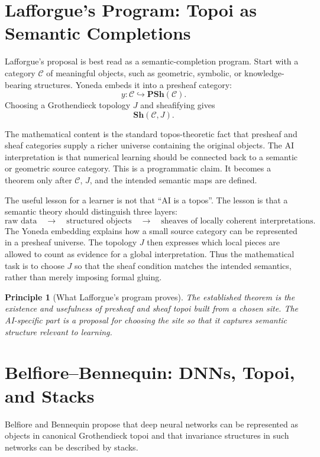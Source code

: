 \documentclass[11pt]{article}
\newtheorem{principle}[definition]{Principle}
\newcommand{\PSh}{\mathbf{PSh}}
\newcommand{\Sh}{\mathbf{Sh}}
\begin{document}
\section{Lafforgue's Program: Topoi as Semantic Completions}

Lafforgue's proposal is best read as a semantic-completion program. Start with a
category \(\mathcal C\) of meaningful objects, such as geometric, symbolic, or
knowledge-bearing structures. Yoneda embeds it into a presheaf category:
\[
y:\mathcal C\hookrightarrow \PSh(\mathcal C).
\]
Choosing a Grothendieck topology \(J\) and sheafifying gives
\[
\Sh(\mathcal C,J).
\]

The mathematical content is the standard topos-theoretic fact that presheaf and
sheaf categories supply a richer universe containing the original objects. The
AI interpretation is that numerical learning should be connected back to a
semantic or geometric source category. This is a programmatic claim. It becomes
a theorem only after \(\mathcal C\), \(J\), and the intended semantic maps are
defined.

The useful lesson for a learner is not that ``AI is a topos''. The lesson is
that a semantic theory should distinguish three layers:
\[
\text{raw data}\quad\longrightarrow\quad
\text{structured objects}\quad\longrightarrow\quad
\text{sheaves of locally coherent interpretations}.
\]
The Yoneda embedding explains how a small source category can be represented in
a presheaf universe. The topology \(J\) then expresses which local pieces are
allowed to count as evidence for a global interpretation. Thus the mathematical
task is to choose \(J\) so that the sheaf condition matches the intended
semantics, rather than merely imposing formal gluing.

\begin{principle}[What Lafforgue's program proves]
The established theorem is the existence and usefulness of presheaf and sheaf
topoi built from a chosen site. The AI-specific part is a proposal for choosing
the site so that it captures semantic structure relevant to learning.
\end{principle}

\section{Belfiore--Bennequin: DNNs, Topoi, and Stacks}

Belfiore and Bennequin propose that deep neural networks can be represented as
objects in canonical Grothendieck topoi and that invariance structures in such
networks can be described by stacks.
\end{document}
